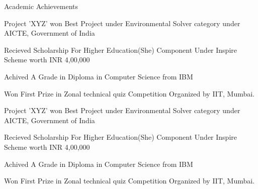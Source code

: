 \documentclass{resume} %
\begin{document}
\begin{rSection}{Academic Achievements} 
\item Project 'XYZ' won Best Project under Environmental Solver category under AICTE, Government of India
\item Recieved Scholarship For Higher Education(She) Component Under Inspire Scheme worth INR 4,00,000
\item Achived A Grade in Diploma in Computer Science from IBM
\item Won First Prize in Zonal technical quiz Competition Organized by IIT, Mumbai.
\item Project 'XYZ' won Best Project under Environmental Solver category under AICTE, Government of India
\item Recieved Scholarship For Higher Education(She) Component Under Inspire Scheme worth INR 4,00,000
\item Achived A Grade in Diploma in Computer Science from IBM
\item Won First Prize in Zonal technical quiz Competition Organized by IIT, Mumbai.
\end{rSection}
\end{document}
